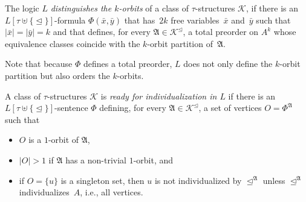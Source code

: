 \documentclass[]{lmcs}
\newcommand{\defining}[1]{\emph{#1}}
\newcommand{\disunion}{\mathbin{\uplus}}
\newcommand{\set}[1]{\lbrace #1 \rbrace}
\newcommand{\uniVarA}{x}
\newcommand{\uniVarB}{y}
\newcommand{\formA}{\Phi}
\newcommand{\tup}[1]{\bar{#1}}
\newcommand{\Struct}{\mathfrak{A}}
\newcommand{\StructV}{A}
\newcommand{\vertA}{u}
\newcommand{\StructA}{\mathfrak{A}}
\newcommand{\StructVA}{A}
\newcommand{\GraphClass}{\mathcal{K}}
\newcommand{\sig}{\tau}
\newcommand{\indRel}{\trianglelefteq}
\newcommand{\indClosure}[1]{#1^\indRel}
\begin{document}
\begin{defi}
	The logic $L$ \defining{distinguishes the $k$-orbits} of a class of $\sig$-structures $\GraphClass$,
	if there is an $L[\sig\disunion\set{\indRel}]$-formula $\formA(\tup{\uniVarA},\tup{\uniVarB})$
	that has~$2k$ free variables~$\tup{\uniVarA}$ and~$\tup{\uniVarB}$ such that $|\tup{\uniVarA}| = |\tup{\uniVarB}| = k$
	and that defines, for every $\StructA \in \indClosure{\GraphClass}$, a total preorder on $\StructVA^k$ 
	whose equivalence classes coincide with the $k$-orbit partition of~$\StructA$.
\end{defi}
Note that because $\formA$ defines a total preorder,
$L$ does not only define the $k$-orbit partition
but also orders the $k$-orbits.


\begin{defi}
	A class of $\sig$-structures $\GraphClass$ is \defining{ready for individualization in $L$}
	if there is an $L[\sig\disunion\set{\indRel}]$-sentence $\formA$
	defining, for every $\Struct \in \indClosure{\GraphClass}$,
	a set of vertices $O = \formA^\Struct$ such that
	\begin{itemize}
		\item $O$ is a $1$-orbit of $\Struct$,
		\item $|O|>1$ if $\Struct$ has a non-trivial $1$-orbit, and
		\item if $O =\set{\vertA}$ is a singleton set,
		then $\vertA$ is not individualized by $\indRel^\Struct$ unless $\indRel^\Struct$ individualizes~$\StructV$, i.e., all vertices.
	\end{itemize}
\end{defi}
\end{document}

